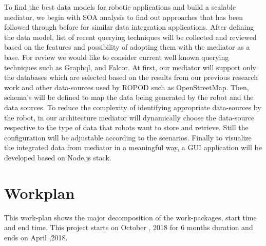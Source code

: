 \documentclass[12pt]{article}
\begin{document}
To find the best data models for robotic applications and build a scalable mediator, we begin with SOA analysis to find out approaches that has been followed through before for similar data integration applications. After defining the data model, list of recent querying techniques will be collected and reviewed based on the features and possibility of adopting them with the mediator as a base. For review we would like to consider current well known querying techniques such as Graphql, and Falcor. At first, our mediator will support only the databases which are selected based on the results from our previous research work \cite{ravichandranworkbench} and other data-sources used by ROPOD such as OpenStreetMap. Then, schema's will be defined to map the data being generated by the robot and the data sources. To reduce the complexity of identifying appropriate data-sources by the robot, in our architecture mediator will dynamically choose the data-source respective to the type of data that robots want to store and retrieve. Still the configuration will be adjustable according to the scenarios. Finally to visualize the integrated data from mediator in a meaningful way, a GUI application will be developed based on Node.js stack.

\section{Workplan}
This work-plan shows the major decomposition of the work-packages, start time and end time. This project starts on October , 2018 for 6 months duration and ends on April ,2018.
\newpage
\end{document}
